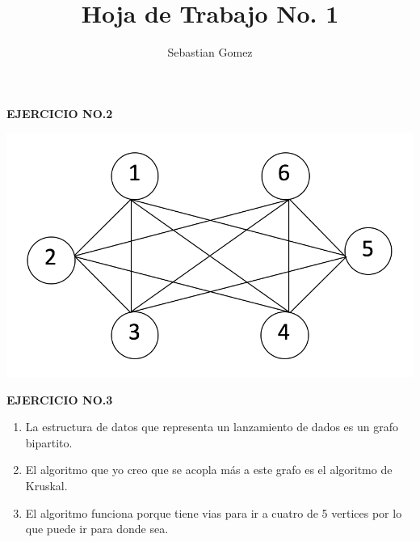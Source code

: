 \documentclass{article}
\begin{document}
\title{\textbf {Hoja de Trabajo No. 1}}
\author{Sebastian Gomez}
\maketitle

\textbf {EJERCICIO NO.2}

\begin{center}
\includegraphics{grafo dados.png}
\end{center}
\begin{enumerate}
[$<1,2>$ $<1,3>$ $<1,4>$ <$1,5>$ $<2,3>$ $<2,4>$ $<2,6>$ $<3,5>$ $<3,6>$ $<4,5>$$<4,6>$ $<5,6>$]
\end{enumerate}


\textbf {EJERCICIO NO.3}
\begin{enumerate}
\item La estructura de datos que representa un lanzamiento de dados es un grafo bipartito.
\item El algoritmo que yo creo que se acopla más a este grafo es el algoritmo de Kruskal.
\item El algoritmo funciona porque tiene vias para ir a cuatro de 5 vertices por lo que puede ir para donde sea. 
\end{enumerate}
\end{document}
